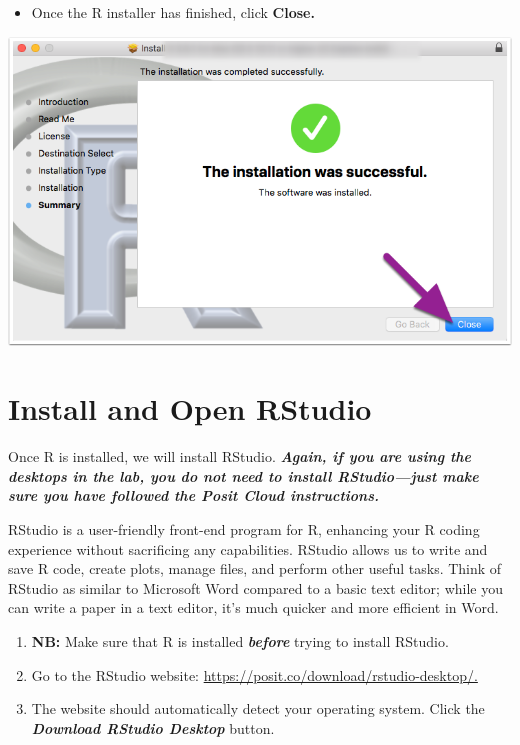 \documentclass[
]{book}
\providecommand{\tightlist}{%
  \setlength{\itemsep}{0pt}\setlength{\parskip}{0pt}}
\begin{document}
\begin{itemize}
\tightlist
\item
  Once the R installer has finished, click \textbf{Close.}
\end{itemize}

\includegraphics{img/01-install_finish_mac.png}

\section{Install and Open RStudio}\label{install-and-open-rstudio}

Once R is installed, we will install RStudio. \textbf{\emph{Again, if you are using the desktops in the lab, you do not need to install RStudio---just make sure you have followed the Posit Cloud instructions.}}

RStudio is a user-friendly front-end program for R, enhancing your R coding experience without sacrificing any capabilities. RStudio allows us to write and save R code, create plots, manage files, and perform other useful tasks. Think of RStudio as similar to Microsoft Word compared to a basic text editor; while you can write a paper in a text editor, it's much quicker and more efficient in Word.

\begin{enumerate}
\def\labelenumi{\arabic{enumi}.}
\item
  \textbf{NB:} Make sure that R is installed \textbf{\emph{before}} trying to install RStudio.
\item
  Go to the RStudio website: \url{https://posit.co/download/rstudio-desktop/.}
\item
  The website should automatically detect your operating system. Click the \textbf{\emph{Download RStudio Desktop}} button.
\end{enumerate}
\end{document}

